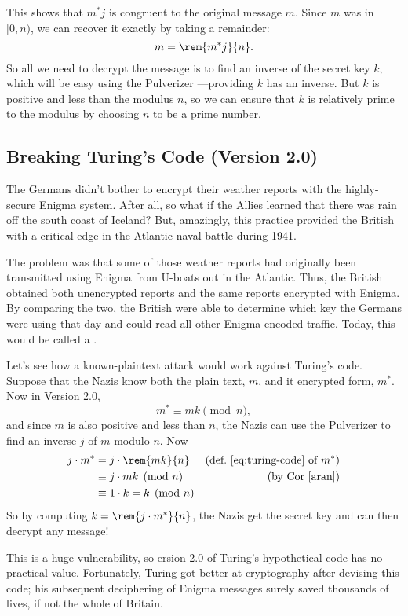 This shows that $m^* j$ is congruent to the original message $m$.  Since $m$ was in
$[0,n)$, we can recover it exactly by taking a remainder:
\[
m = \rem{m^* j}{n}.
\]
So all we need to decrypt the message is to find an inverse of the
secret key $k$, which will be easy using the Pulverizer ---providing
$k$ has an inverse.  But $k$ is positive and less than the modulus
$n$, so we can ensure that $k$ is relatively prime to the modulus by
choosing $n$ to be a prime number.

\subsection{Breaking Turing's Code (Version 2.0)}

The Germans didn't bother to encrypt their weather reports with the
highly-secure Enigma system.  After all, so what if the Allies learned
that there was rain off the south coast of Iceland?  But, amazingly,
this practice provided the British with a critical edge in the
Atlantic naval battle during 1941.

The problem was that some of those weather reports had originally been
transmitted using Enigma from U-boats out in the Atlantic.  Thus, the
British obtained both unencrypted reports and the same reports
encrypted with Enigma.  By comparing the two, the British were able to
determine which key the Germans were using that day and could read all
other Enigma-encoded traffic.  Today, this would be called a
.

Let's see how a known-plaintext attack would work against Turing's
code.  Suppose that the Nazis know both the plain text, $m$, and it
encrypted form, $m^*$.  Now in Version 2.0,
\[
m^* \equiv mk \pmod{n},
\]
and since $m$ is also positive and less than $n$, the Nazis can use
the Pulverizer to find an inverse $j$ of $m$ modulo $n$.  Now
\begin{align*}
j \cdot m^*
  & = j \cdot \rem{mk}{n}
     & \text{(def.~\eqref{eq:turing-code} of $m^*$)}\\
  & \equiv j \cdot mk \pmod{n}
     & \text{(by Cor~\ref{aran})}\\
  & \equiv 1 \cdot k = k \pmod{n}
\end{align*}
So by computing $k = \rem{j \cdot m^*}{n}$, the Nazis get the secret
key and can then decrypt any message!

This is a huge vulnerability, so ersion 2.0 of Turing's hypothetical
code has no practical value.  Fortunately, Turing got better at
cryptography after devising this code; his subsequent deciphering of
Enigma messages surely saved thousands of lives, if not the whole of
Britain.


